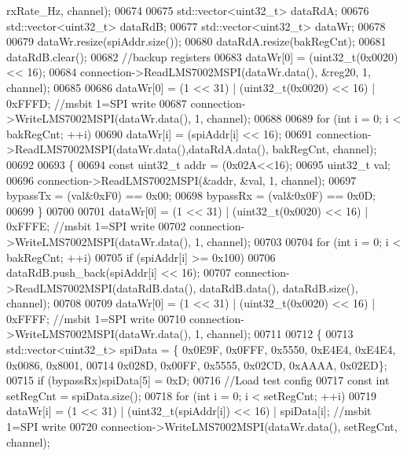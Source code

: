 \begin{DoxyCode}
{{{{{      rxRate\_Hz, channel);
00674 
00675     std::vector<uint32\_t> dataRdA;
00676     std::vector<uint32\_t> dataRdB;
00677     std::vector<uint32\_t> dataWr;
00678 
00679     dataWr.resize(spiAddr.size());
00680     dataRdA.resize(bakRegCnt);
00681     dataRdB.clear();
00682     \textcolor{comment}{//backup registers}
00683     dataWr[0] = (uint32\_t(0x0020) << 16);
00684     connection->ReadLMS7002MSPI(dataWr.data(), &reg20, 1, channel);
00685 
00686     dataWr[0] = (1 << 31) | (uint32\_t(0x0020) << 16) | 0xFFFD; \textcolor{comment}{//msbit 1=SPI write}
00687     connection->WriteLMS7002MSPI(dataWr.data(), 1, channel);
00688 
00689     \textcolor{keywordflow}{for} (\textcolor{keywordtype}{int} i = 0; i < bakRegCnt; ++i)
00690         dataWr[i] = (spiAddr[i] << 16);
00691     connection->ReadLMS7002MSPI(dataWr.data(),dataRdA.data(), bakRegCnt, channel);
00692 
00693     \{
00694         \textcolor{keyword}{const} uint32\_t addr = (0x02A<<16);
00695         uint32\_t val;
00696         connection->ReadLMS7002MSPI(&addr, &val, 1, channel);
00697         bypassTx = (val&0xF0) == 0x00;
00698         bypassRx = (val&0x0F) == 0x0D;
00699     \}
00700 
00701     dataWr[0] = (1 << 31) | (uint32\_t(0x0020) << 16) | 0xFFFE; \textcolor{comment}{//msbit 1=SPI write}
00702     connection->WriteLMS7002MSPI(dataWr.data(), 1, channel);
00703 
00704     \textcolor{keywordflow}{for} (\textcolor{keywordtype}{int} i = 0; i < bakRegCnt; ++i)
00705         \textcolor{keywordflow}{if} (spiAddr[i] >= 0x100)
00706             dataRdB.push\_back(spiAddr[i] << 16);
00707     connection->ReadLMS7002MSPI(dataRdB.data(), dataRdB.data(), dataRdB.size(), channel);
00708 
00709     dataWr[0] = (1 << 31) | (uint32\_t(0x0020) << 16) | 0xFFFF; \textcolor{comment}{//msbit 1=SPI write}
00710     connection->WriteLMS7002MSPI(dataWr.data(), 1, channel);
00711 
00712     \{
00713         std::vector<uint32\_t> spiData = \{ 0x0E9F, 0x0FFF, 0x5550, 0xE4E4, 0xE4E4, 0x0086, 0x8001,
00714                                           0x028D, 0x00FF, 0x5555, 0x02CD, 0xAAAA, 0x02ED\};
00715         \textcolor{keywordflow}{if} (bypassRx)spiData[5] = 0xD;
00716         \textcolor{comment}{//Load test config}
00717         \textcolor{keyword}{const} \textcolor{keywordtype}{int} setRegCnt = spiData.size();
00718         \textcolor{keywordflow}{for} (\textcolor{keywordtype}{int} i = 0; i < setRegCnt; ++i)
00719             dataWr[i] = (1 << 31) | (uint32\_t(spiAddr[i]) << 16) | spiData[i]; \textcolor{comment}{//msbit 1=SPI write}
00720         connection->WriteLMS7002MSPI(dataWr.data(), setRegCnt, channel);
}}}}}
\end{DoxyCode}
